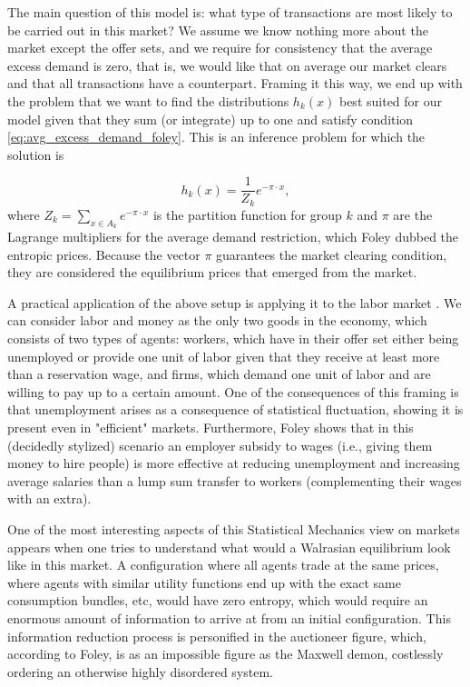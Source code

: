 The main question of this model is: what type of transactions are most likely to be carried out in this market? We assume we know nothing more about the market except the offer sets, and we require for consistency that the average excess demand is zero, that is, we would like that on average our market clears and that all transactions have a counterpart. Framing it this way, we end up with the problem that we want to find the distributions $h_k(x)$ best suited for our model given that they sum (or integrate) up to one and satisfy condition \eqref{eq:avg_excess_demand_foley}. This is an inference problem for which the solution is

\begin{equation}
h_k (x) = \frac{1}{Z_k} e^{-\pi \cdot x},
\end{equation}
where $Z_k = \sum_{x\in A_k} e^{-\pi\cdot x}$ is the partition function for group $k$ and $\pi$ are the Lagrange multipliers for the average demand restriction, which Foley dubbed the entropic prices. Because the vector $\pi$ guarantees the market clearing condition, they are considered the equilibrium prices that emerged from the market.

A practical application of the above setup is applying it to the labor market \cite{Foley96}. We can consider labor and money as the only two goods in the economy, which consists of two types of agents: workers, which have in their offer set either being unemployed or provide one unit of labor given that they receive at least more than a reservation wage, and firms, which demand one unit of labor and are willing to pay up to a certain amount. One of the consequences of this framing is that unemployment arises as a consequence of statistical fluctuation, showing it is present even in "efficient" markets. Furthermore, Foley shows that in this (decidedly stylized) scenario an employer subsidy to wages (i.e., giving them money to hire people) is more effective at reducing unemployment and increasing average salaries than a lump sum transfer to workers (complementing their wages with an extra).

One of the most interesting aspects of this Statistical Mechanics view on markets appears when one tries to understand what would a Walrasian equilibrium look like in this market. A configuration where all agents trade at the same prices, where agents with similar utility functions end up with the exact same consumption bundles, etc, would have zero entropy, which would require an enormous amount of information to arrive at from an initial configuration. This information reduction process is personified in the auctioneer figure, which, according to Foley, is as an impossible figure as the Maxwell demon, costlessly ordering an otherwise highly disordered system.


